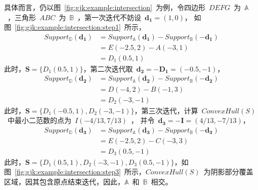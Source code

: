 具体而言，仍以图~\ref{fig:gjk:example:intersection}~为例，令四边形~$DEFG$~为~$\mathbb{A}$~，三角形~$ABC$~为~$\mathbb{B}$~，第一次迭代不妨设~$\bm{d_1} = (1,0)$，
如图~\ref{fig:gjk:example:intersection:step1}~所示，
\begin{equation}
  \begin{array}{ll}
    Support_\mathbb{D}(\bm{d_1}) & = Support_\mathbb{A}(\bm{d_1}) - Support_\mathbb{B}(-\bm{d_1}) \\
                            & = E(-2.5, 2) - A(-3,1) \\
                            & = D_1(0.5, 1)
  \end{array}
  \label{euqa:gjk:step1}
\end{equation}
此时，$\bm{S} = \{D_1(0.5, 1)\}$，第二次迭代取~$\bm{d_2}=-\bm{D_1}=(-0.5, -1)$，
\begin{equation}
  \begin{array}{ll}
  Support_\mathbb{D}(\bm{d_2})  & = Support_\mathbb{A}(\bm{d_2}) - Support_\mathbb{B}(-\bm{d_2}) \\
    & = D(-4, 2) - B(-1, 3) \\
    & = D_2(-3, -1)
  \end{array}
  \label{euqa:gjk:step2}
\end{equation}
此时，$\bm{S} = \{D_1(-0.5, 1), D_2(-3, -1)\}$，第三次迭代，计算~$ConvexHull(S)$~中最小二范数的点为~$I(-4/13, 7/13)$~，
并令~$\bm{d_3}=-\bm{I}=(4/13, -7/13)$，
\begin{equation}
  \begin{array}{ll}
  Support_\mathbb{D}(\bm{d_3})  & = Support_\mathbb{A}(\bm{d_3}) - Support_\mathbb{B}(-\bm{d_3}) \\
    & = E(-2.5, 2) - C(-3, 3) \\
    & = D_3(0.5, -1)
  \end{array}
  \label{euqa:gjk:step3}
\end{equation}
此时，$\bm{S} = \{D_1(0.5, 1), D_2(-3, -1), D_3(0.5, -1)\}$，如图~\ref{fig:gjk:example:intersection:step3}~所示，$ConvexHull(S)$~为阴影部分覆盖区域，因其包含原点结束迭代，因此，$\mathbb{A}$~和~$\mathbb{B}$~相交。

